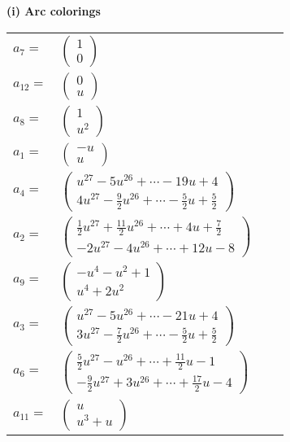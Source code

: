 \documentclass[1p]{elsarticle_modified}
\theoremstyle{definition}
\begin{document}
\flushleft \textbf{(i) Arc colorings}\\
\begin{tabular}{m{7pt} m{180pt} m{7pt} m{180pt} }
\flushright $a_{7}=$&$\begin{pmatrix}1\\0\end{pmatrix}$ \\
\flushright $a_{12}=$&$\begin{pmatrix}0\\u\end{pmatrix}$ \\
\flushright $a_{8}=$&$\begin{pmatrix}1\\u^2\end{pmatrix}$ \\
\flushright $a_{1}=$&$\begin{pmatrix}- u\\u\end{pmatrix}$ \\
\flushright $a_{4}=$&$\begin{pmatrix}u^{27}-5 u^{26}+\cdots-19 u+4\\4 u^{27}-\frac{9}{2} u^{26}+\cdots-\frac{5}{2} u+\frac{5}{2}\end{pmatrix}$ \\
\flushright $a_{2}=$&$\begin{pmatrix}\frac{1}{2} u^{27}+\frac{11}{2} u^{26}+\cdots+4 u+\frac{7}{2}\\-2 u^{27}-4 u^{26}+\cdots+12 u-8\end{pmatrix}$ \\
\flushright $a_{9}=$&$\begin{pmatrix}- u^4- u^2+1\\u^4+2 u^2\end{pmatrix}$ \\
\flushright $a_{3}=$&$\begin{pmatrix}u^{27}-5 u^{26}+\cdots-21 u+4\\3 u^{27}-\frac{7}{2} u^{26}+\cdots-\frac{5}{2} u+\frac{5}{2}\end{pmatrix}$ \\
\flushright $a_{6}=$&$\begin{pmatrix}\frac{5}{2} u^{27}- u^{26}+\cdots+\frac{11}{2} u-1\\-\frac{9}{2} u^{27}+3 u^{26}+\cdots+\frac{17}{2} u-4\end{pmatrix}$ \\
\flushright $a_{11}=$&$\begin{pmatrix}u\\u^3+u\end{pmatrix}$ \\

\end{tabular}
\end{document}
